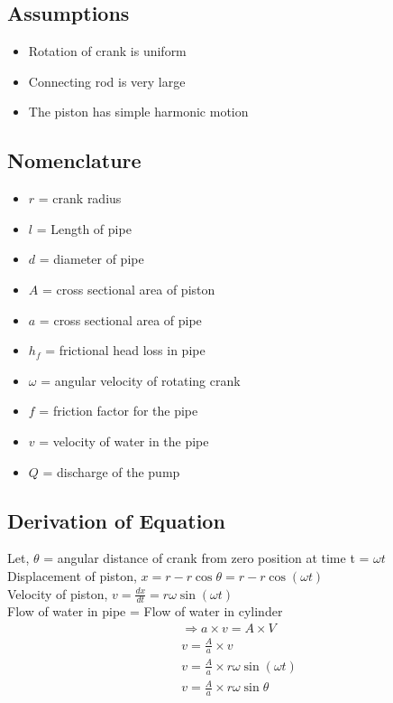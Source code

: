 \documentclass{article}
\begin{document}
    \begin{multicols}{2}
      \subsection*{Assumptions}
      \begin{itemize}
        \item Rotation of crank is uniform
        \item Connecting rod is very large
        \item The piston has simple harmonic motion
      \end{itemize}

      \subsection*{Nomenclature}
      \begin{itemize}
        \item $r$ = crank radius
        \item $l$ = Length of pipe  
        \item $d$ = diameter of pipe 
        \item $A$ = cross sectional area of piston
        \item $a$ = cross sectional area of pipe
        \item $h_f$ = frictional head loss in pipe
        \item $\omega$ = angular velocity of rotating crank
        \item $f$ = friction factor for the pipe 
        \item $v$ = velocity of water in the pipe 
        \item $Q$ = discharge of the pump
      \end{itemize}

      \subsection*{Derivation of Equation}
      Let, $\theta$ = angular distance of crank from zero position at time t = $\omega t$ \\
      Displacement of piston, $x = r - r \cos \theta = r - r\cos (\omega t)$ \\
      Velocity of piston, $v = \frac{dx}{dt} = r \omega \sin (\omega t)$ \\
      Flow of water in pipe = Flow of water in cylinder \\
      \begin{align*}
        &\Rightarrow a \times v = A \times V \\
        & v = \frac{A}{a} \times v \\
        & v = \frac{A}{a} \times r \omega \sin (\omega t) \\
        & v = \frac{A}{a} \times r \omega \sin \theta \\
      \end{align*}


\end{multicols}
\end{document}
